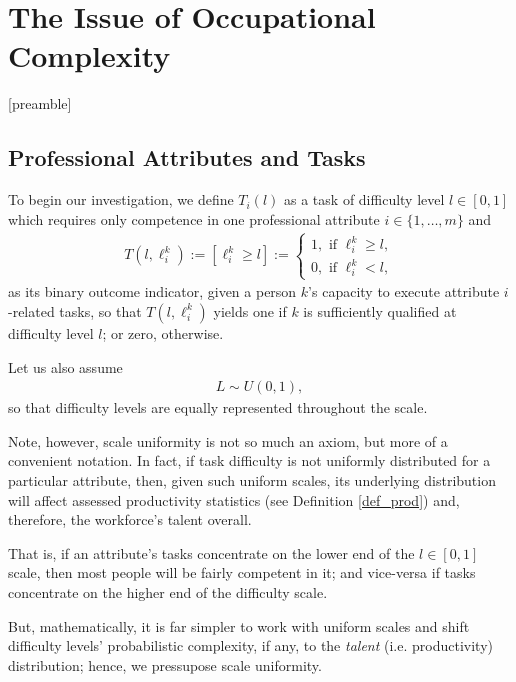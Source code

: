 \documentclass[hidelinks, nonatbib]{elsarticle}
\begin{document}

\newpage
\section{The Issue of Occupational Complexity}
[preamble]

\subsection{Professional Attributes and Tasks}
\begin{definition}
    \label{def_task}
    To begin our investigation, we define $T_i(l)$ as a task of difficulty level $l \in [0,1]$ which requires only competence in one professional attribute $i \in \{1, \dots, m\}$ and
    \begin{gather}
        T(l,\ell_{i}^{k})
        :=
        [\ell_{i}^{k} \geq l]
        :=
        \begin{cases}
            1, \text{ if } \ell_{i}^{k} \geq l,
            \\
            0, \text{ if } \ell_{i}^{k} < l,
        \end{cases}
    \end{gather}
    as its binary outcome indicator, given a person $k$'s capacity to execute attribute $i$-related tasks, so that $T(l,\ell_{i}^{k})$ yields one if $k$ is sufficiently qualified at difficulty level $l$; or zero, otherwise.
\end{definition}
\begin{axiom}
    \label{sua}
    Let us also assume
    \begin{gather}
        L \sim U(0,1)
        ,
    \end{gather}
    so that difficulty levels are equally represented throughout the scale.
    
    Note, however, scale uniformity is not so much an axiom, but more of a convenient notation. In fact, if task difficulty is not uniformly distributed for a particular attribute, then, given such uniform scales, its underlying distribution will affect assessed productivity statistics (see Definition \ref{def_prod}) and, therefore, the workforce's talent overall.
    
    That is, if an attribute's tasks concentrate on the lower end of the $l \in [0,1]$ scale, then most people will be fairly competent in it; and vice-versa if tasks concentrate on the higher end of the difficulty scale.
    
    But, mathematically, it is far simpler to work with uniform scales and shift difficulty levels' probabilistic complexity, if any, to the \textit{talent} (i.e. productivity) distribution; hence, we pressupose scale uniformity.
\end{axiom}
\end{document}

